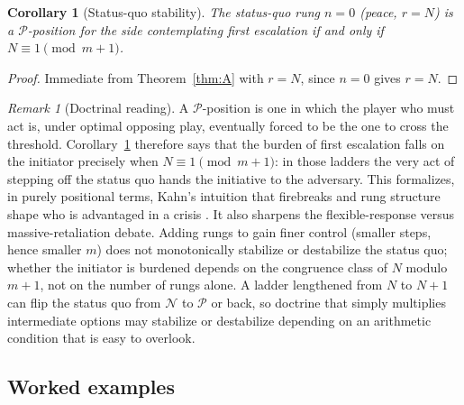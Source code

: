 \documentclass[11pt]{article}
\theoremstyle{plain}
\newtheorem{corollary}[theorem]{Corollary}
\theoremstyle{definition}
\theoremstyle{remark}
\newtheorem{remark}[theorem]{Remark}
\begin{document}
\begin{corollary}[Status-quo stability]\label{cor:Aprime}
The status-quo rung $n=0$ (peace, $r=N$) is a $\mathcal{P}$-position for the
side contemplating first escalation if and only if
$N \equiv 1 \pmod{m+1}$.
\end{corollary}

\begin{proof}
Immediate from Theorem~\ref{thm:A} with $r=N$, since $n=0$ gives $r=N$.
\end{proof}

\begin{remark}[Doctrinal reading]\label{rem:design}
A $\mathcal{P}$-position is one in which the player who must act is, under
optimal opposing play, eventually forced to be the one to cross the
threshold. Corollary~\ref{cor:Aprime} therefore says that the burden of
first escalation falls on the initiator precisely when
$N\equiv 1\pmod{m+1}$: in those ladders the very act of stepping off the
status quo hands the initiative to the adversary. This formalizes, in
purely positional terms, Kahn's intuition that firebreaks and rung structure
shape who is advantaged in a crisis \citep{kahn1965}. It also sharpens the
flexible-response versus massive-retaliation debate. Adding rungs to gain
finer control (smaller steps, hence smaller $m$) does not monotonically
stabilize or destabilize the status quo; whether the initiator is burdened
depends on the congruence class of $N$ modulo $m+1$, not on the number of
rungs alone. A ladder lengthened from $N$ to $N+1$ can flip the status quo
from $\mathcal{N}$ to $\mathcal{P}$ or back, so doctrine that simply
multiplies intermediate options may stabilize or destabilize depending on an
arithmetic condition that is easy to overlook.
\end{remark}

\subsection{Worked examples}
\end{document}
